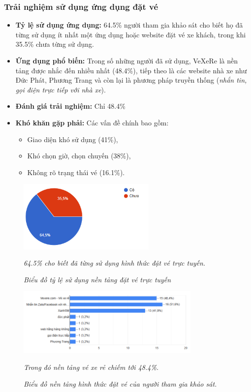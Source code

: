\subsubsection{Trải nghiệm sử dụng ứng dụng đặt vé}
\begin{itemize}
    \item \textbf{Tỷ lệ sử dụng ứng dụng:} 64.5\% người tham gia khảo sát cho biết họ đã từng sử dụng ít nhất một ứng dụng hoặc website đặt vé xe khách, trong khi 35.5\% chưa từng sử dụng.
    \item \textbf{Ứng dụng phổ biến:} Trong số những người đã sử dụng, VeXeRe là nền tảng được nhắc đến nhiều nhất (48.4\%), tiếp theo là các website nhà xe như Đức Phát, Phương Trang và còn lại là phương pháp truyền thống (\textit{nhắn tin, gọi điện trực tiếp với nhà xe}).
    \item \textbf{Đánh giá trải nghiệm:} Chỉ 48.4\% %
    \item \textbf{Khó khăn gặp phải:} Các vấn đề chính bao gồm:
    \begin{itemize}
        \item Giao diện khó sử dụng (41\%),
        \item Khó chọn giờ, chọn chuyến (38\%),
        \item Không rõ trạng thái vé (16.1\%).
    \end{itemize}
\end{itemize}
\begin{center}

    \begin{figure}[h]
    \centering
    \includegraphics[width=0.6\textwidth]{assets/chart/1.4.5.png}
    \caption{\textit{Biểu đồ tỷ lệ sử dụng nền tảng đặt vé trực tuyến}} \textit{ 64.5\% cho biết đã từng sử dụng hình thức đặt vé trực tuyến.}
    \label{fig:muc_dich}
\end{figure}

    \begin{figure}[h]
    \centering
    \includegraphics[width=0.8\textwidth]{assets/chart/1.4.6.png}
    \caption{\textit{Biểu đồ nền tảng hình thức đặt vé của người tham gia khảo sát.}} \textit{Trong đó nền tảng vé xe rẻ chiếm tới 48.4\%.}
    \label{fig:muc_xep_hang}
\end{figure}
\end{center}
